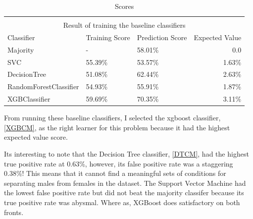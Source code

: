 \setlength{\extrarowheight}{1.5pt}
\begin{table}[!htbp]
\caption{Scores} %
\centering %
\begin{tabular}{|l|l|l|r|} %
\hline %


\multicolumn{4}{|c|}{}\\
\multicolumn{4}{|c|}{Result of training the baseline classifiers}\\[5pt]
\hline
Classifier & Training Score & Prediction Score & Expected Value\\[0.5ex]
\hline %

Majority & - & 58.01\% & 0.0 \\
SVC     & 55.39\% & 53.57\% & 1.63\% \\
DecisionTree       & 51.08\% & 62.44\% & 2.63\%\\
RandomForestClassifier   & 54.93\% & 55.91\% & 1.87\%\\
XGBClassifier            & 59.69\% & 70.35\% & 3.11\%\\

\hline%
\end{tabular}
\label{tableBenchMarkScores}{}
\end{table}

From running these baseline classifiers, I selected the xgboost classifier, \ref{XGBCM}, as the right learner for this problem because it had the highest expected value score.

Its interesting to note that the Decision Tree classifier, \ref{DTCM}, had the highest true positive rate at 0.63\%, however, its false positive rate was a staggering 0.38\%! This means that it cannot find a meaningful sets of conditions for separating males from females in the dataset. The Support Vector Machine had the lowest false positive rate but did not beat the majority classifer because its true positive rate was abysmal. Where as, XGBoost does satisfactory on both fronts.

